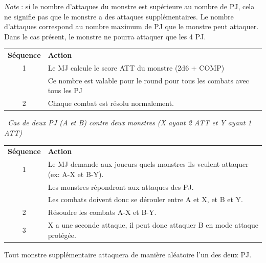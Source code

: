 \begin{frame}[b]
{\begin{minipage}[c][0.95\textheight][c]{\linewidth}
\textit{Note} : si le nombre d'attaques du monstre est supérieure au nombre de PJ, cela ne signifie pas que le monstre a des attaques supplémentaires. Le nombre d'attaques correspond au nombre maximum de PJ que le monstre peut attaquer. Dans le cas présent, le monstre ne pourra attaquer que les 4 PJ.

\vspace{0.2cm}

\begin{tabular}{cp{7.1cm}}
\textbf{Séquence} & \textbf{Action} \\
         1 & Le MJ calcule le score ATT du monstre (2d6 + COMP)                          \\
           & Ce nombre  est valable pour le round pour tous les combats avec tous les PJ \\
         2 & Chaque combat est résolu normalement.                                       \\
\end{tabular}

\vspace{0.2cm}

\textit{\mybullet\ Cas de deux PJ (A et B) contre deux monstres (X ayant 2 ATT et Y ayant 1 ATT)}

\vspace{0.2cm}

\begin{tabular}{cp{7.1cm}}
\textbf{Séquence} & \textbf{Action} \\
         1 & Le MJ demande aux joueurs quels monstres ils veulent attaquer (ex: A-X et B-Y). \\
           & Les monstres répondront aux attaques des PJ.                                    \\
           & Les combats doivent donc se dérouler entre A et X, et B et Y.                   \\
         2 & Résoudre les combats A-X et B-Y.                                                \\
         3 & X a une seconde attaque, il peut donc attaquer B en mode attaque protégée.      \\
\end{tabular}

\vspace{0.2cm}

Tout monstre supplémentaire attaquera de manière aléatoire l'un des deux PJ.



\end{minipage}}
\end{frame}
